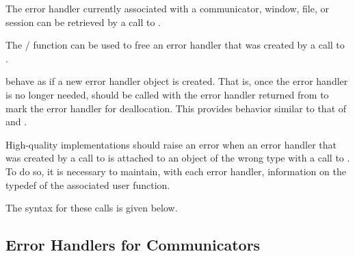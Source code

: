 The error handler currently associated with a communicator, window, file, or session
can be retrieved by a call to .

The \mpi/ function  can be used to free an
error handler that was created by a call to
.
 
%
%
%
%
 behave as if a
new error handler object is created.
That is, once the error handler is no longer needed,
 should be called with the error handler returned
from
to mark the error handler for deallocation.
This provides behavior similar to that of  and
.

\begin{implementors}
High-quality implementations should raise an error when an error handler
that
%
%
%
%
was created by a call to  is
attached to an object of the wrong type with a call to
.  To do so, it is necessary to
maintain, with each error handler, information on the typedef of the
associated user function.
\end{implementors}

The syntax for these calls is given below.





\subsection{Error Handlers for Communicators}
\label{subsec:inquiry-errhdlr-comm}

